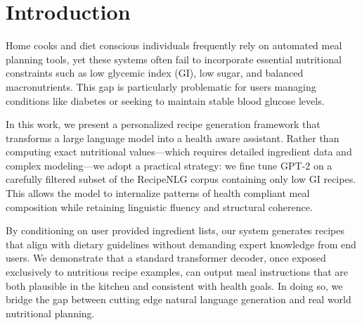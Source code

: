 \section{Introduction}

Home cooks and diet conscious individuals frequently rely on automated meal planning tools, yet these systems often fail to incorporate essential nutritional constraints such as low glycemic index (GI), low sugar, and balanced macronutrients. This gap is particularly problematic for users managing conditions like diabetes or seeking to maintain stable blood glucose levels.

In this work, we present a personalized recipe generation framework that transforms a large language model into a health aware assistant. Rather than computing exact nutritional values—which requires detailed ingredient data and complex modeling—we adopt a practical strategy: we fine tune GPT-2 on a carefully filtered subset of the RecipeNLG corpus containing only low GI recipes. This allows the model to internalize patterns of health compliant meal composition while retaining linguistic fluency and structural coherence.

By conditioning on user provided ingredient lists, our system generates recipes that align with dietary guidelines without demanding expert knowledge from end users. We demonstrate that a standard transformer decoder, once exposed exclusively to nutritious recipe examples, can output meal instructions that are both plausible in the kitchen and consistent with health goals. In doing so, we bridge the gap between cutting edge natural language generation and real world nutritional planning.
